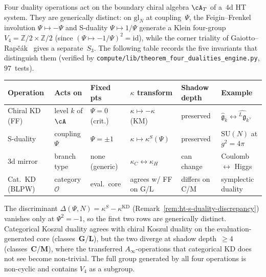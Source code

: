 \begin{remark}
\label{rem:ht-four-dualities-comparison}
Four duality operations act on the boundary chiral algebra
$\cA_T$ of a~$4$d HT system. They are generically distinct:
on $\mathrm{gl}_N$ at coupling~$\Psi$,
the Feigin--Frenkel involution $\Psi \mapsto -\Psi$
and S-duality $\Psi \mapsto 1/\Psi$
generate a Klein four-group
$V_4 = \mathbb{Z}/2 \times \mathbb{Z}/2$
(since $(\Psi \mapsto -1/\Psi)^2 = \mathrm{id}$),
while the corner triality of
Gaiotto--Rap\v{c}\'ak~\cite{gaiotto-rapchak}
gives a separate~$S_3$.
The following table records the five invariants that
distinguish them
(verified by \texttt{compute/lib/theorem\_four\_dualities\_engine.py},
$97$~tests).

\begin{center}
\renewcommand{\arraystretch}{1.25}
\footnotesize
\begin{tabular}{llllll}
\toprule
\textbf{Operation}
& \textbf{Acts on}
& \textbf{Fixed pts}
& \textbf{$\kappa$ transform}
& \textbf{Shadow depth}
& \textbf{Example} \\
\midrule
Chiral KD (FF)
 & level $k$ of $\cA$
 & $\Psi = 0$ (crit.)
 & $\kappa \mapsto -\kappa$ (KM)
 & preserved
 & $\widehat{\mathfrak{g}}_k \leftrightarrow
 \widehat{{}^L\!\mathfrak{g}}_{k^\vee}$ \\[3pt]
S-duality
 & coupling $\Psi$
 & $\Psi = \pm 1$
 & $\kappa \mapsto \kappa^S(\Psi)$
 & preserved
 & $\mathrm{SU}(N)$ at $g^2 = 4\pi$ \\[3pt]
3d mirror
 & branch type
 & none (generic)
 & $\kappa_C \leftrightarrow \kappa_H$
 & can change
 & Coulomb $\leftrightarrow$ Higgs \\[3pt]
Cat.\ KD (BLPW)
 & category $\mathcal{O}$
 & eval.\ core
 & agrees w/ FF on G/L
 & differs on C/M
 & symplectic duality~\cite{BLPW16} \\
\bottomrule
\end{tabular}
\end{center}

\noindent
The discriminant $\Delta(\Psi,N) = \kappa^S - \kappa^{\mathrm{KD}}$
(Remark~\ref{rem:ht-s-duality-discrepancy})
vanishes only at $\Psi^2 = -1$, so the first two rows are
generically distinct. Categorical Koszul duality
agrees with chiral Koszul duality on the evaluation-generated
core (classes~$\mathbf{G}$/$\mathbf{L}$), but the two diverge
at shadow depth~$\geq 4$ (classes~$\mathbf{C}$/$\mathbf{M}$),
where the transferred $A_\infty$-operations
that categorical KD does not see become non-trivial.
The full group generated by all four operations is
non-cyclic and contains $V_4$ as a subgroup.
\end{remark}

